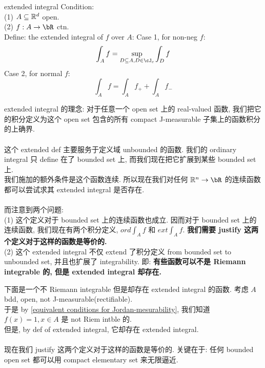 \documentclass[lang=cn,11pt]{elegantbook}
\begin{document}
\begin{definition}{extended integral}
    Condition:\\
    (1) $A \subseteq \mathbb{R}^d$ open.\\
    (2) $f:A\rar \bR $ ctn.\\
    Define: the extended integral of $f$ over $A$:
    Case 1, for non-neg $f$:
    $$
    \int_A f = \sup_{D \sub A, D\in \cJ_c} \int_D f
    $$
    Case 2, for normal $f$:
    $$
    \int_A f = \int_A f_+ + \int_A f_-
    $$
\end{definition}
\begin{remark}
    extended integral 的理念: 对于任意一个 open set 上的 real-valued 函数, 我们把它的积分定义为这个 open set 包含的所有 compact J-measurable 子集上的函数积分的上确界.\\\\
    这个 extended def 主要服务于定义域 unbounded 的函数. 我们的 ordinary integral 只 define 在了 bounded set 上, 而我们现在把它扩展到某些 bounded set 上.\\
    我们施加的额外条件是这个函数连续. 所以现在我们对任何 $\BR^n \rar \bR$ 的连续函数都可以尝试求其 extended integral 是否存在.\\\\
    而注意到两个问题:\\
    (1) 这个定义对于 bounded set 上的连续函数也成立. 因而对于 bounded set 上的连续函数, 我们现在有两个积分定义, $ord \int_A f$ 和 $ext \int_A f$. \textbf{我们需要 justify 这两个定义对于这样的函数是等价的.}\\
    (2) 这个 extended integral 不仅 extend 了积分定义 from bounded set to unbounded set, 并且也扩展了 integrability. 即: \textbf{有些函数可以不是 Riemann integrable 的, 但是 extended integral 却存在.}
\end{remark}

\begin{example}
    下面是一个不 Riemann integrable 但是却存在 extended integral 的函数.
    考虑 $A$ bdd, open, not J-measurable(rectifiable).\\
    于是 by \ref{equivalent conditions for Jordan-mesurability}, 我们知道 $f(x) = 1, x\in A$ 是 not Riem intble 的.\\
    但是, by def of extended integral, 它却存在 extended integral.
\end{example}

\paragraph*{}现在我们 justify 这两个定义对于这样的函数是等价的. 关键在于: 任何 bounded open set 都可以用 compact elementary set 来无限逼近.
\end{document}
